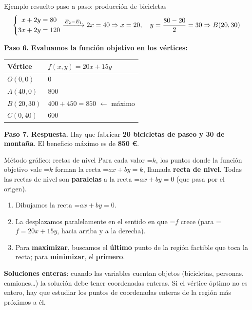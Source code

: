 \documentclass[11pt,a4paper]{article}
\newcommand{\fmm}[1]{\setbox0=\hbox{$#1$}\ifdim\wd0>\linewidth\fmdisp{#1}\else\mbox{\box0}\fi}
\newcommand{\fmdisp}[1]{\[\setbox2=\hbox{$\displaystyle #1$}\ifdim\wd2>\linewidth\resizebox{\linewidth}{!}{\box2}\else\box2\fi\]}
\newcommand{\fmuline}[1]{\textbf{\color{fmaccent}#1}}
\begin{document}
\begin{fmex}{Ejemplo resuelto paso a paso: producción de bicicletas}
\fmdisp{\left\{\begin{aligned}x+2y&=80\\ 3x+2y&=120\end{aligned}\right.\xrightarrow{E_2-E_1}2x=40\Rightarrow x=20,\quad y=\frac{80-20}{2}=30\Rightarrow B(20,30)}

\textbf{Paso 6. Evaluamos la función objetivo en los vértices:}

\begin{center}\renewcommand{\arraystretch}{1.5}\small\begin{tabularx}{\linewidth}{>{\raggedright\arraybackslash}p{3.2cm}>{\raggedright\arraybackslash}X}\toprule
\textbf{Vértice} & \textbf{$f(x,y)=20x+15y$}\\\midrule
$O(0,0)$ & $0$\\[3pt]
$A(40,0)$ & $800$\\[3pt]
\cellcolor{fmyellow!45}$B(20,30)$ & \cellcolor{fmyellow!45}$400+450=850$ $\leftarrow$ máximo\\[3pt]
$C(0,40)$ & $600$\\[3pt]
\bottomrule\end{tabularx}\end{center}

\textbf{Paso 7. Respuesta.} Hay que fabricar \textbf{20 bicicletas de paseo y 30 de montaña}. El beneficio máximo es de \textbf{850 €}.
\end{fmex}

\begin{fmdef}{Método gráfico: rectas de nivel}
Para cada valor \fmm{k}, los puntos donde la función objetivo vale \fmm{k} forman la recta \fmm{ax+by=k}, llamada \textbf{recta de nivel}. Todas las rectas de nivel son \textbf{paralelas} a la recta \fmm{ax+by=0} (que pasa por el origen).

\begin{enumerate}
\item Dibujamos la recta \fmm{ax+by=0}.
\item La desplazamos paralelamente en el sentido en que \fmm{f} crece (para \fmm{f=20x+15y}, hacia arriba y a la derecha).
\item Para \textbf{maximizar}, buscamos el \textbf{último} punto de la región factible que toca la recta; para \textbf{minimizar}, el \textbf{primero}.
\end{enumerate}

\begin{fmnote}\fmuline{Soluciones enteras}: cuando las variables cuentan objetos (bicicletas, personas, camiones\dots{}) la solución debe tener coordenadas enteras. Si el vértice óptimo no es entero, hay que estudiar los puntos de coordenadas enteras de la región más próximos a él.\end{fmnote}
\end{fmdef}
\end{document}
